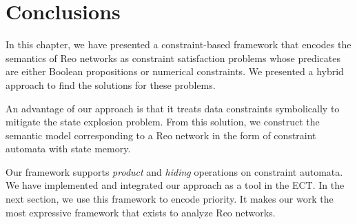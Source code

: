 \section{Conclusions}\label{sec:conclusions}%
In this chapter, we have presented a constraint-based framework that encodes the semantics of Reo networks as constraint satisfaction problems whose predicates are either Boolean propositions or numerical constraints. We presented a hybrid approach to find the solutions for these problems. 

An advantage of our approach is that it treats data constraints symbolically to mitigate the state explosion problem. From this solution, we construct the semantic model corresponding to a Reo network in the form of constraint automata with state memory. 

Our framework supports \emph{product} and \emph{hiding} operations on constraint automata. We have implemented and integrated our approach as a tool in the ECT. 
 In the next section, we use this framework to encode priority. It makes our work the most expressive framework that exists to analyze Reo networks. %
